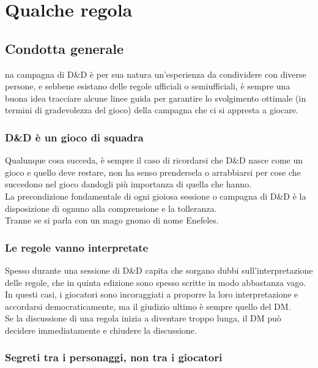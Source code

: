 \chapter{Qualche regola}

\section{Condotta generale}

na campagna di D\&D è per sua natura un'esperienza da condividere con diverse persone, e sebbene esistano delle regole ufficiali o semiufficiali, è sempre una buona idea tracciare alcune linee guida per garantire lo svolgimento ottimale (in termini di gradevolezza del gioco) della campagna che ci si appresta a giocare.

\subsection{D\&D è un gioco di squadra}

Qualunque cosa succeda, è sempre il caso di ricordarsi che D\&D nasce come un gioco e quello deve restare, non ha senso prendersela o arrabbiarsi per cose che succedono nel gioco dandogli più importanza di quella che hanno. \\ La precondizione fondamentale di ogni gioiosa sessione o campagna di D\&D è la disposizione di ognuno alla comprensione e la tolleranza. \\ Tranne se si parla con un mago gnomo di nome Enefeles.

\subsection{Le regole vanno interpretate}

Spesso durante una sessione di D\&D capita che sorgano dubbi sull'interpretazione delle regole, che in quinta edizione sono spesso scritte in modo abbastanza vago. \\ In questi casi, i giocatori sono incoraggiati a proporre la loro interpretazione e accordarsi democraticamente, ma il giudizio ultimo è sempre quello del DM. \\ Se la discussione di una regola inizia a diventare troppo lunga, il DM può decidere immediatamente e chiudere la discussione.

\subsection{Segreti tra i personaggi, non tra i giocatori}

